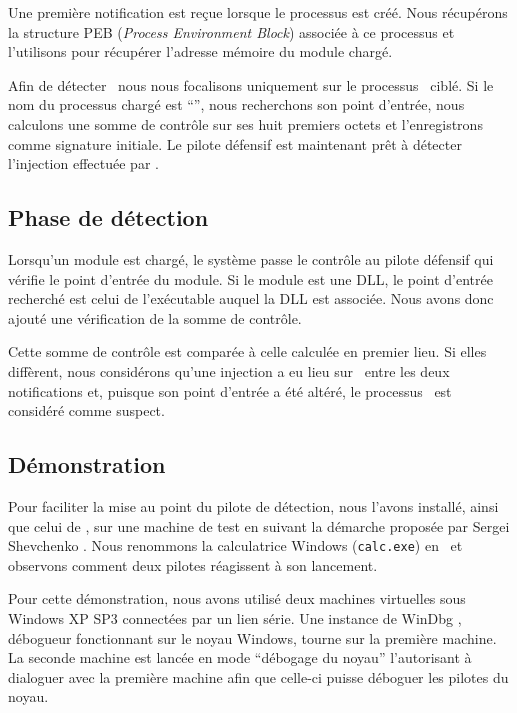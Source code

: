 Une première notification est reçue lorsque le processus est créé.
Nous récupérons la structure PEB (\emph{Process Environment Block}) associée à ce processus et l'utilisons pour récupérer l'adresse mémoire du module chargé.

Afin de détecter \duqu\ nous nous focalisons uniquement sur le processus \services\ ciblé.
Si le nom du processus chargé est ``\services '', nous recherchons son point d'entrée, nous calculons une somme de contrôle sur ses huit premiers octets et l'enregistrons comme signature initiale.
Le pilote défensif est maintenant prêt à détecter l'injection effectuée par \duqu.

\subsection{Phase de détection}
Lorsqu'un module est chargé, le système passe le contrôle au pilote défensif qui vérifie le point d'entrée du module.
Si le module est une DLL, le point d'entrée recherché est celui de l'exécutable auquel la DLL est associée.
Nous avons donc ajouté une vérification de la somme de contrôle.

Cette somme de contrôle est comparée à celle calculée en premier lieu.
Si elles diffèrent, nous considérons qu'une injection a eu lieu sur \services\ entre les deux notifications et, puisque son point d'entrée a été altéré, le processus \services\ est considéré comme suspect.


\subsection{Démonstration}
Pour faciliter la mise au point du pilote de détection, nous l'avons installé, ainsi que celui de \duqu, sur une machine de test en suivant la démarche proposée par Sergei Shevchenko \cite{SShevchenko}.
Nous renommons la calculatrice Windows (\texttt{calc.exe}) en \services\ et observons comment deux pilotes réagissent à son lancement.

Pour cette démonstration, nous avons utilisé deux machines virtuelles sous Windows XP SP3 connectées par un lien série.
Une instance de WinDbg \cite{WinDbg}, débogueur fonctionnant sur le noyau Windows, tourne sur la première machine.
La seconde machine est lancée en mode ``débogage du noyau'' l'autorisant à dialoguer avec la première machine afin que celle-ci puisse déboguer les pilotes du noyau.

